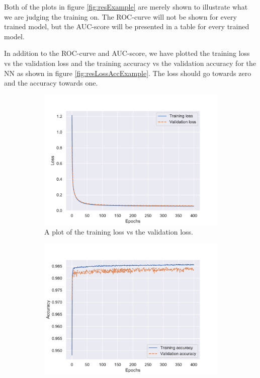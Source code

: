 Both of the plots in figure \ref{fig:resExample} are merely shown to illustrate what we are judging the training on. The ROC-curve will not be shown for every trained model, but the AUC-score will be presented in a table for every trained model.

In addition to the ROC-curve and AUC-score, we have plotted the training loss vs the validation loss and the training accuracy vs the validation accuracy for the NN as shown in figure \ref{fig:resLossAccExample}. The loss should go towards zero and the accuracy towards one. 

\begin{figure}[H]
    \centering
    \begin{subfigure}[t!]{0.49\textwidth}
        \includegraphics[width = \textwidth]{Figures/SlepSlep/ML/NN/High_level/Inter/Loss_sig_slepslep_high_level_high.pdf}
        \caption{A plot of the training loss vs the validation loss.}
        \label{fig:LossExample}
    \end{subfigure}
    \begin{subfigure}[t!]{0.49\textwidth}
        \includegraphics[width = \textwidth]{Figures/SlepSlep/ML/NN/High_level/Inter/Accuracy_sig_slepslep_high_level_high.pdf}

\end{subfigure}
\end{figure}
